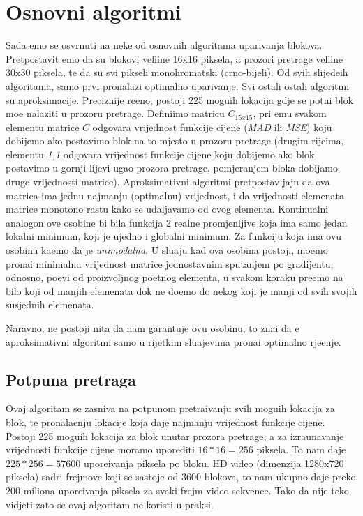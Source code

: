 \section{Osnovni algoritmi}
Sada \cj emo se osvrnuti na neke od osnovnih algoritama uparivanja blokova. Pretpostavit \cj emo da su blokovi veli\ch ine 16x16 piksela, a prozori pretrage veli\ch ine 30x30 piksela, te da su svi pikseli monohromatski
(crno-bijeli). Od svih slijede\cj ih algoritama, samo prvi pronalazi optimalno uparivanje. Svi ostali ostali algoritmi su aproksimacije. Preciznije re\ch eno, postoji 225 mogu\cj ih lokacija gdje se po\ch tni blok mo\zh e nalaziti
u prozoru pretrage. Defini\sh imo matricu $C_{15x15}$, pri \ch emu svakom elementu matrice $C$ odgovara vrijednost funkcije cijene (\textit{MAD} ili \textit{MSE}) koju dobijemo ako postavimo blok na to mjesto u prozoru pretrage
(drugim rije\ch ima, elementu \textit{1,1} odgovara vrijednost funkcije cijene koju dobijemo ako blok postavimo u gornji lijevi ugao prozora pretrage, pomjeranjem bloka dobijamo druge vrijednosti matrice).
Aproksimativni algoritmi pretpostavljaju da ova matrica ima jednu najmanju (optimalnu) vrijednost, i da vrijednosti elemenata matrice monotono rastu kako se udaljavamo od ovog elementa. Kontinualni analogon ove osobine
bi bila funkcija 2 realne promjenljive koja ima samo jedan lokalni minimum, koji je ujedno i globalni minimum. Za funkciju koja ima ovu osobinu ka\zh emo da je \textit{unimodalna}. U slu\ch aju kad ova osobina postoji,
mo\zh emo prona\cj i minimalnu vrijednost matrice jednostavnim spu\sh tanjem po gradijentu, odnosno, po\ch ev\sh i od proizvoljnog po\ch etnog elementa, u svakom koraku pre\dj emo na bilo koji od manjih elemenata dok ne
do\dj emo do nekog koji je manji od svih svojih susjednih elemenata.

Naravno, ne postoji ni\sh ta da nam garantuje ovu osobinu, \sh to zna\ch i da \cj e aproksimativni algoritmi samo u rijetkim slu\ch ajevima prona\cj i optimalno rje\sh enje.

\subsection{Potpuna pretraga}
Ovaj algoritam se zasniva na potpunom pretra\zh ivanju svih mogu\cj ih lokacija za blok, te pronala\zh enju lokacije koja daje najmanju vrijednost funkcije cijene. Postoji 225 mogu\cj ih lokacija za blok unutar prozora pretrage,
a za izra\ch unavanje vrijednosti funkcije cijene moramo uporediti $16 * 16 = 256$ piksela. To nam daje $225 * 256 = 57600$ upore\dj ivanja piksela po bloku. HD video (dimenzija 1280x720 piksela) sadr\zh i frejmove koji se
sastoje od 3600 blokova, \sh to nam ukupno daje preko 200 miliona upore\dj ivanja piksela za svaki frejm video sekvence. Tako da nije te\sh ko vidjeti za\sh to se ovaj algoritam ne koristi u praksi.

